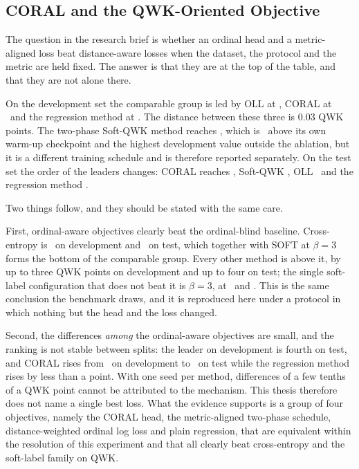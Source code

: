 



\subsection{CORAL and the QWK-Oriented Objective}

The question in the research brief is whether an ordinal head and a metric-aligned loss beat
distance-aware losses when the dataset, the protocol and the metric are held fixed. The answer
is that they are at the top of the table, and that they are not alone there.

On the development set the comparable group is led by OLL at \devQwkOLL, CORAL at
\devQwkCoral\ and the regression method at \devQwkMSE. The distance between these three is
0.03 QWK points. The two-phase Soft-QWK method reaches \devQwkSoftqwk, which is
\softqwkPhaseTwoGain\ above its own warm-up checkpoint and the highest development value
outside the ablation, but it is a different training schedule and is therefore reported
separately. On the
test set the order of the leaders changes: CORAL reaches \testQwkCoral, Soft-QWK
\testQwkSoftqwk, OLL \testQwkOLL\ and the regression method \testQwkMSE.

Two things follow, and they should be stated with the same care.

First, ordinal-aware objectives clearly beat the ordinal-blind baseline. Cross-entropy is
\devQwkCE\ on development and \testQwkCE\ on test, which together with SOFT at $\beta=3$
forms the bottom of the comparable group. Every other method is above it, by up to three QWK
points on development and up to four on test; the single soft-label configuration that does not
beat it is $\beta=3$, at \devQwkSoftThree\ and \testQwkSoftThree. This is the same
conclusion the benchmark draws, and it is reproduced here under a protocol in which nothing but
the head and the loss changed.

Second, the differences \emph{among} the ordinal-aware objectives are small, and the ranking is
not stable between splits: the leader on development is fourth on test, and CORAL rises from
\devQwkCoral\ on development to \testQwkCoral\ on test while the regression method rises by
less than a point. With one seed per method, differences of a few tenths of a QWK point cannot be attributed
to the mechanism. This thesis therefore does not name a single best loss. What the evidence
supports is a group of four objectives, namely the CORAL head, the metric-aligned two-phase
schedule, distance-weighted ordinal log loss and plain regression, that are equivalent within
the resolution of this experiment and that all clearly beat cross-entropy and the soft-label
family on QWK.


